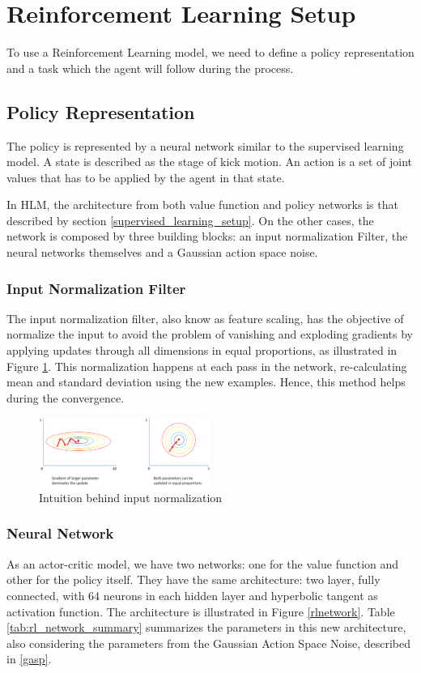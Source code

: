\section{Reinforcement Learning Setup}

To use a Reinforcement Learning model, we need to define a policy representation and a task which the agent will follow during the process.

\subsection{Policy Representation}

The policy is represented by a neural network similar to the supervised learning model. A state is described as the stage of kick motion. An action is a set of joint values that has to be applied by the agent in that state.

In HLM, the architecture from both value function and policy networks is that described by section \ref{supervised_learning_setup}. On the other cases, the network is composed by three building blocks: an input normalization Filter, the neural networks themselves and a Gaussian action space noise.

\subsubsection{Input Normalization Filter}
The input normalization filter, also know as feature scaling, has the objective of normalize the input to avoid the problem of vanishing and exploding gradients by applying updates through all dimensions in equal proportions, as illustrated in Figure \ref{inputnormfig}. This normalization happens at each pass in the network, re-calculating mean and standard deviation using the new examples. Hence, this method helps during the convergence.

\begin{figure}[!htbp]
	\centering
	\includegraphics[width=0.5\textwidth]{Cap5/inputnorm.eps}
	\caption{Intuition behind input normalization}
	\label{inputnormfig}
\end{figure}

\subsubsection{Neural Network}
As an actor-critic model, we have two networks: one for the value function and other for the policy itself. They have the same architecture: two layer, fully connected, with 64 neurons in each hidden layer and hyperbolic tangent as activation function. The architecture is illustrated in Figure \ref{rlnetwork}. Table \ref{tab:rl_network_summary} summarizes the parameters in this new architecture, also considering the parameters from the Gaussian Action Space Noise, described in \ref{gasp}.

